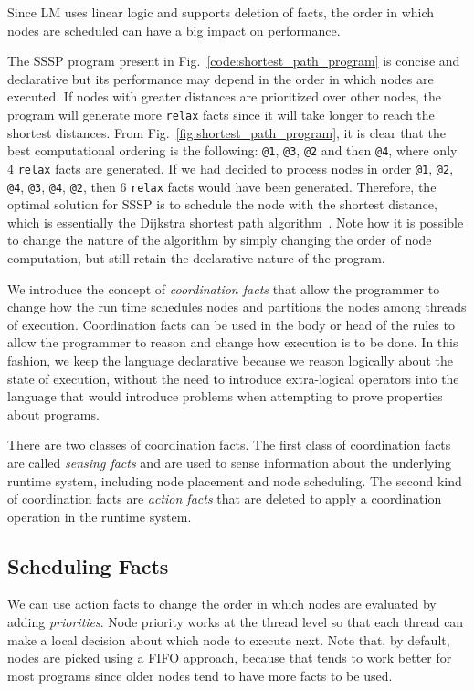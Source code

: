 Since LM uses linear logic and supports deletion of facts, the order in which
nodes are scheduled can have a big impact on performance.

The SSSP program present in Fig.~\ref{code:shortest_path_program} is concise and
declarative but its performance may depend in the order in which nodes are
executed. If nodes with greater distances are prioritized over other nodes, the
program will generate more \texttt{relax} facts since it will take longer to
reach the shortest distances. From Fig.~\ref{fig:shortest_path_program}, it is
clear that the best computational ordering is the following: \texttt{@1},
\texttt{@3}, \texttt{@2} and then \texttt{@4}, where only 4 \texttt{relax}
facts are generated. If we had decided to process nodes in order
\texttt{@1}, \texttt{@2}, \texttt{@4}, \texttt{@3}, \texttt{@4},
\texttt{@2}, then 6 \texttt{relax} facts would have been generated.
Therefore, the optimal solution for SSSP is to schedule the node with the
shortest distance, which is essentially the Dijkstra shortest path
algorithm~\cite{Dijkstra}. Note how it is possible to change the nature of
the algorithm by simply changing the order of node computation, but still
retain the declarative nature of the program.

We introduce the concept of \emph{coordination facts} that allow the programmer
to change how the run time schedules nodes and partitions the nodes among
threads of execution. Coordination facts can be used in the body or head of the
rules to allow the programmer to reason and change how execution is to be done.
In this fashion, we keep the language declarative because we reason logically
about the state of execution, without the need to introduce extra-logical
operators into the language that would introduce problems when attempting to prove
properties about programs.

There are two classes of coordination facts. The first class of coordination facts are
called \emph{sensing facts} and are used to sense information about the
underlying runtime system, including node placement and node scheduling.
The second kind of coordination facts are \emph{action facts} that are deleted
to apply a coordination operation in the runtime system.

\subsection{Scheduling Facts}\label{sec:fifo}

We can use action facts to change the order in which nodes are evaluated by adding
\emph{priorities}. Node priority works at the thread level
so that each thread can make a local decision about which node to execute next.
Note that, by default, nodes are picked using a FIFO approach, because that
tends to work better for most programs since older nodes tend to have more facts
to be used.

